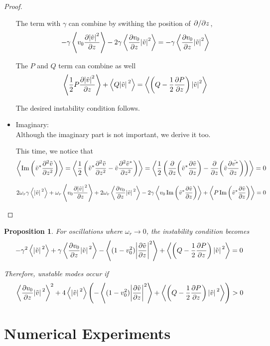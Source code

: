 \documentclass{article}
\theoremstyle{plain}
\newtheorem{proposition}{Proposition}
\theoremstyle{definition}
\theoremstyle{remark}
\theoremstyle{remark}
\begin{document}
\begin{proof}
\begin{itemize}
    The term with $\gamma$ can combine by swithing the position of $\pdv*{z}$,
    \[ - \gamma\expval{v_0 \pdv{\abs{\tilde{v}}^2}{z}} 
    - 2\gamma\expval{\pdv{v_0}{z}\abs{\tilde{v}}^2}
    = - \gamma\expval{\pdv{v_0}{z}\abs{\tilde{v}}^2} \]

    The $P$ and $Q$ term can combine as well
    \[ \expval{\frac{1}{2}P\pdv{\abs{\tilde{v}}^2}{z}}
    + \expval{Q\abs*{\tilde{v}}^2}
    = \expval{ \left(Q - \frac{1}{2}\pdv{P}{z}\right)\abs{\tilde{v}}^2 } \]

    The desired instability condition follows.

    \item Imaginary: \\ 
    Although the imaginary part is not important, we derive it too.

    This time, we notice that 
    \[ \expval{ \Im\left(\tilde{v}^*\pdv[2]{\tilde{v}}{z}\right) } 
    = \expval{\frac{1}{2}\left(\tilde{v}^*\pdv[2]{\tilde{v}}{z} - \tilde{v}\pdv[2]{\tilde{v}^*}{z}\right)}
    = \expval{\frac{1}{2}\left( \pdv{z}(\tilde{v}^*\pdv{\tilde{v}}{z}) - \pdv{z}(\tilde{v}\pdv{\tilde{v^*}}{z}) \right)}
    = 0 \]

    \[
        2\omega_r\gamma \expval{\abs*{\tilde{v}}^2} 
        + \omega_r\expval{v_0\pdv{\abs*{\tilde{v}}^2}{z}}
        + 2\omega_r\expval{\pdv{v_0}{z}\abs*{\tilde{v}}^2}
        - 2\gamma \expval{v_0\Im\left(\tilde{v}^*\pdv{\tilde{v}}{z}\right)}
        + \expval{P\Im\left(\tilde{v}^*\pdv{\tilde{v}}{z}\right)} = 0
    \]
\end{itemize}
\end{proof}

\begin{proposition}
    For oscillations where $\omega_r\to 0$, the instability condition becomes
    \[ -\gamma^2 \expval{\abs*{\tilde{v}}^2} 
    + \gamma\expval{\pdv{v_0}{z}\abs*{\tilde{v}}^2} 
    - \expval{(1-v_0^2)\abs{\pdv{\tilde{v}}{z}}^2 }
    + \expval{\left(Q-\frac{1}{2}\pdv{P}{z}\right)\abs*{\tilde{v}}^2} = 0 \]
    
    Therefore, unstable modes occur if 
    \[ \expval{\pdv{v_0}{z}\abs*{\tilde{v}}^2}^2 + 4\expval{\abs*{\tilde{v}}^2}\left( - \expval{(1-v_0^2)\abs{\pdv{\tilde{v}}{z}}^2 }
    + \expval{\left(Q-\frac{1}{2}\pdv{P}{z}\right)\abs*{\tilde{v}}^2} \right) > 0   \]
\end{proposition}


\newpage
\section{Numerical Experiments}
\end{document}
